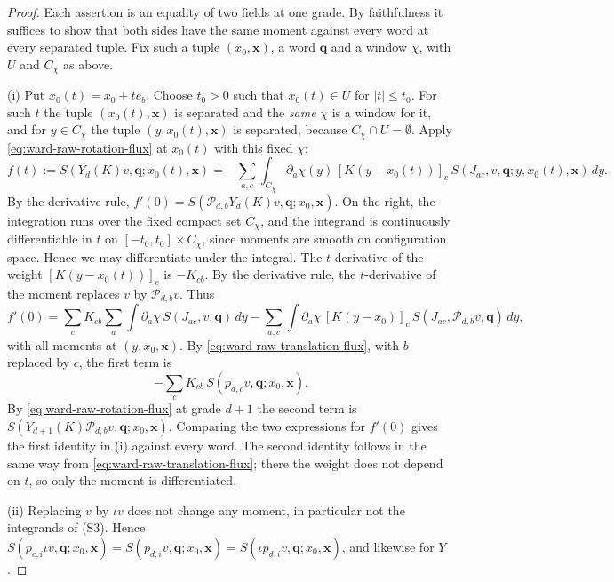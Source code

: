 \begin{proof}
Each assertion is an equality of two fields at one grade.  By faithfulness
it suffices to show that both sides have the same moment against every
word at every separated tuple.  Fix such a tuple $(x_0,\boldsymbol x)$, a
word $\boldsymbol q$ and a window $\chi$, with $U$ and $C_\chi$ as above.

(i) Put $x_0(t)=x_0+te_b$.  Choose $t_0>0$ such that $x_0(t)\in U$ for
$|t|\le t_0$.  For such $t$ the tuple $(x_0(t),\boldsymbol x)$ is
separated and the \emph{same} $\chi$ is a window for it, and for
$y\in C_\chi$ the tuple $(y,x_0(t),\boldsymbol x)$ is separated, because
$C_\chi\cap U=\emptyset$.  Apply \eqref{eq:ward-raw-rotation-flux} at
$x_0(t)$ with this fixed $\chi$:
\[
 f(t):=S(Y_d(K)v,\boldsymbol q;x_0(t),\boldsymbol x)
 =-\sum_{a,c}\int_{C_\chi}\partial_a\chi(y)\,[K(y-x_0(t))]_c\,
   S(J_{ac},v,\boldsymbol q;y,x_0(t),\boldsymbol x)\,dy.
\]
By the derivative rule,
$f'(0)=S(\mathcal P_{d,b}Y_d(K)v,\boldsymbol q;x_0,\boldsymbol x)$.  On the
right, the integration runs over the fixed compact set $C_\chi$, and the
integrand is continuously differentiable in $t$ on
$[-t_0,t_0]\times C_\chi$, since moments are smooth on configuration space.
Hence we may differentiate under the integral.  The $t$-derivative of the
weight $[K(y-x_0(t))]_c$ is $-K_{cb}$.  By the derivative rule, the
$t$-derivative of the moment replaces $v$ by $\mathcal P_{d,b}v$.  Thus
\[
 f'(0)=\sum_cK_{cb}\sum_a\int\partial_a\chi\,
        S(J_{ac},v,\boldsymbol q)\,dy
      -\sum_{a,c}\int\partial_a\chi\,[K(y-x_0)]_c\,
        S(J_{ac},\mathcal P_{d,b}v,\boldsymbol q)\,dy,
\]
with all moments at $(y,x_0,\boldsymbol x)$.  By
\eqref{eq:ward-raw-translation-flux}, with $b$ replaced by $c$, the first
term is
\[
 -\sum_cK_{cb}\,S(p_{d,c}v,\boldsymbol q;x_0,\boldsymbol x).
\]
By
\eqref{eq:ward-raw-rotation-flux} at grade $d+1$ the second term is
$S(Y_{d+1}(K)\mathcal P_{d,b}v,\boldsymbol q;x_0,\boldsymbol x)$.
Comparing the two expressions for $f'(0)$ gives the first identity in (i)
against every word.  The second identity follows in the same way from
\eqref{eq:ward-raw-translation-flux}; there the weight does not depend on
$t$, so only the moment is differentiated.

(ii) Replacing $v$ by $\iota v$ does not change any moment, in particular
not the integrands of (S3).  Hence
$S(p_{e,i}\iota v,\boldsymbol q;x_0,\boldsymbol x)
=S(p_{d,i}v,\boldsymbol q;x_0,\boldsymbol x)
=S(\iota p_{d,i}v,\boldsymbol q;x_0,\boldsymbol x)$, and likewise for
$Y$.


\end{proof}
